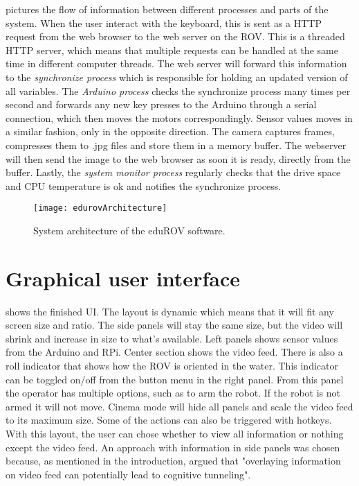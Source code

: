 pictures the flow of information between different processes and parts of the system. When the user interact with the keyboard, this is sent as a HTTP request from the web browser to the web server on the ROV. This is a threaded HTTP server, which means that multiple requests can be handled at the same time in different computer threads. The web server will forward this information to the \textit{synchronize process} which is responsible for holding an updated version of all variables. The \textit{Arduino process} checks the synchronize process many times per second and forwards any new key presses to the Arduino through a serial connection, which then moves the motors correspondingly. Sensor values moves in a similar fashion, only in the opposite direction. The camera captures frames, compresses them to .jpg files and store them in a memory buffer. The webserver will then send the image to the web browser as soon it is ready, directly from the buffer. Lastly, the \textit{system monitor process} regularly checks that the drive space and CPU temperature is ok and notifies the synchronize process.


\begin{figure}[h!]
    \centering
    \texttt{[image: edurovArchitecture]}
    \caption{System architecture of the eduROV software.}
    \label{edurovArchitecture}
\end{figure}

\section{Graphical user interface}

 shows the finished UI. The layout is dynamic which means that it will fit any screen size and ratio. The side panels will stay the same size, but the video will shrink and increase in size to what's available. Left panels shows sensor values from the Arduino and RPi. Center section shows the video feed. There is also a roll indicator that shows how the ROV is oriented in the water. This indicator can be toggled on/off from the button menu in the right panel. From this panel the operator has multiple options, such as to arm the robot. If the robot is not armed it will not move. Cinema mode will hide all panels and scale the video feed to its maximum size. Some of the actions can also be triggered with hotkeys. With this layout, the user can chose whether to view all information or nothing except the video feed. An approach with information in side panels was chosen because, as mentioned in the introduction, \citet{Chen2007} argued that "overlaying information on video feed can potentially lead to cognitive tunneling".

